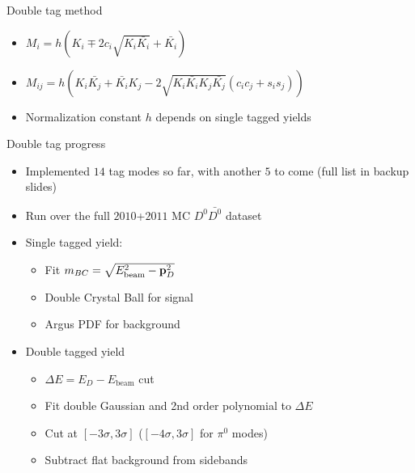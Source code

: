 \documentclass{beamer}
\begin{document}
\begin{frame}{Double tag method}
  \begin{itemize}
    \setlength\itemsep{1.3em}
    \item{$M_i = h(K_i \mp 2c_i\sqrt{K_i\bar{K_i}} + \bar{K_i})$}
    \item{$M_{ij} = h(K_i\bar{K_j} + \bar{K_i}K_j - 2\sqrt{K_i\bar{K_i}K_j\bar{K_j}}(c_ic_j + s_is_j))$}
    \item{Normalization constant $h$ depends on single tagged yields}
  \end{itemize}
\end{frame}

\begin{frame}{Double tag progress}
  \begin{itemize}
    \setlength\itemsep{1.2em}
    \item{Implemented $14$ tag modes so far, with another $5$ to come (full list in backup slides)}
    \item{Run over the full $2010$+$2011$ MC $D^0\bar{D^0}$ dataset}
    \item{Single tagged yield:}
    \begin{itemize}
      \item{Fit $m_{BC} = \sqrt{E_\text{beam}^2 - \vb{p}_D^2}$}
      \item{Double Crystal Ball for signal}
      \item{Argus PDF for background}
    \end{itemize}
    \item{Double tagged yield}
    \begin{itemize}
      \item{$\Delta E = E_D - E_\text{beam}$ cut}
      \item{Fit double Gaussian and 2nd order polynomial to $\Delta E$}
      \item{Cut at $[-3\sigma, 3\sigma]$ ($[-4\sigma, 3\sigma]$ for $\pi^0$ modes)}
      \item{Subtract flat background from sidebands}
    \end{itemize}
  \end{itemize}
\end{frame}
\end{document}
